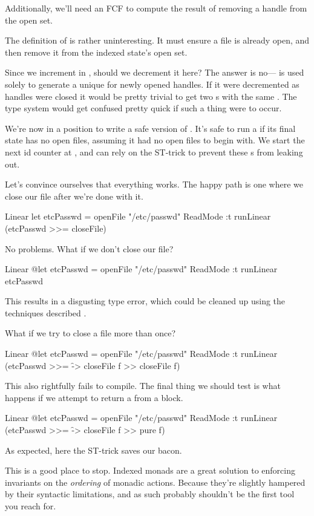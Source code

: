 \documentclass[book.tex]{subfiles}
\begin{document}
Additionally, we'll need an FCF to compute the result of removing a handle from
the open set.


The definition of  is rather uninteresting. It must ensure a file
is already open, and then remove it from the indexed state's open set.


Since we increment  in , should we decrement it here? The
answer is no--- is used solely to generate a unique  for
newly opened handles. If it were decremented as handles were closed it would be
pretty trivial to get two s with the same . The type system
would get confused pretty quick if such a thing were to occur.

We're now in a position to write a safe version of . It's
safe to run a  if its final state has no open files, assuming it
had no open files to begin with. We start the next id counter at , and can
rely on the ST-trick to prevent these s from leaking out.


Let's convince ourselves that everything works. The happy path is one where we
close our file after we're done with it.

\begin{dorepl}{Linear}
let etcPasswd = openFile "/etc/passwd" ReadMode
:t runLinear (etcPasswd >>= closeFile)
\end{dorepl}

No problems. What if we don't close our file?

\begin{dorepl}{Linear}
@let etcPasswd = openFile "/etc/passwd" ReadMode
:t runLinear etcPasswd
\end{dorepl}

This results in a disgusting type error, which could be cleaned up using the
techniques described .

What if we try to close a file more than once?

\begin{dorepl}{Linear}
@let etcPasswd = openFile "/etc/passwd" ReadMode
:t runLinear (etcPasswd >>= \f -> closeFile f >> closeFile f)
\end{dorepl}

This also rightfully fails to compile. The final thing we should test is what
happens if we attempt to return a  from a  block.

\begin{dorepl}{Linear}
@let etcPasswd = openFile "/etc/passwd" ReadMode
:t runLinear (etcPasswd >>= \f -> closeFile f >> pure f)
\end{dorepl}

As expected, here the ST-trick saves our bacon.

This is a good place to stop. Indexed monads are a great solution to enforcing
invariants on the \emph{ordering} of monadic actions. Because they're slightly
hampered by their syntactic limitations, and as such probably shouldn't be the
first tool you reach for.
\end{document}

